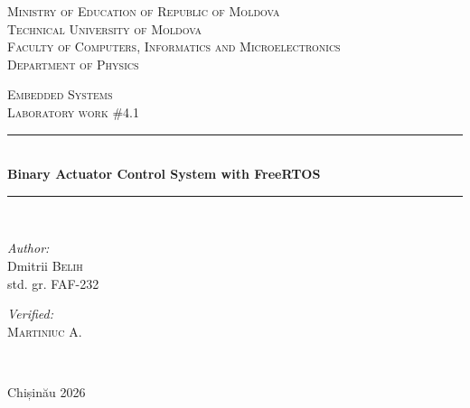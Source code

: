 \documentclass[12pt]{article}
\begin{document}
\begin{titlepage}
	\thispagestyle{empty}
	
	\begin{center}
		\textsc{\large Ministry of Education of Republic of Moldova}\\[0.5cm]
		\textsc{\large Technical University of Moldova}\\[0.5cm]
		\textsc{\large Faculty of Computers, Informatics and Microelectronics}\\[0.5cm]
		\textsc{\large Department of Physics}\\[1.2cm]
	\end{center}

	\vspace{25 mm}

	\begin{center}
		\textsc{\Large Embedded Systems}\\[0.5cm]
		\textsc{\large Laboratory work \#4.1}\\[0.5cm]

		\newcommand{\HRule}{\rule{\linewidth}{0.5mm}}
		\vspace{10 mm}
		\HRule \\[0.4cm]
		{ \LARGE \bfseries Binary Actuator Control System with FreeRTOS}\\[0.4cm]
		\HRule \\[1.5cm]
	\end{center}

	\vspace{10mm}

	\begin{minipage}[t]{0.4\textwidth}
		\begin{flushleft} \large
			\emph{Author:} \\
			Dmitrii \textsc{Belih}\\
			std. gr. FAF-232
		\end{flushleft}
	\end{minipage}
	\hfill
	\begin{minipage}[t]{0.4\textwidth}
		\begin{flushright} \large
			\emph{Verified:} \\
			\textsc{Martiniuc} A.\\
		\end{flushright}
	\end{minipage}\\[3cm]

	\vspace{5 mm}
	\begin{center}
		\large Chișinău 2026\\[0.5cm]
	\end{center}

	\vfill
\end{titlepage}
\end{document}
